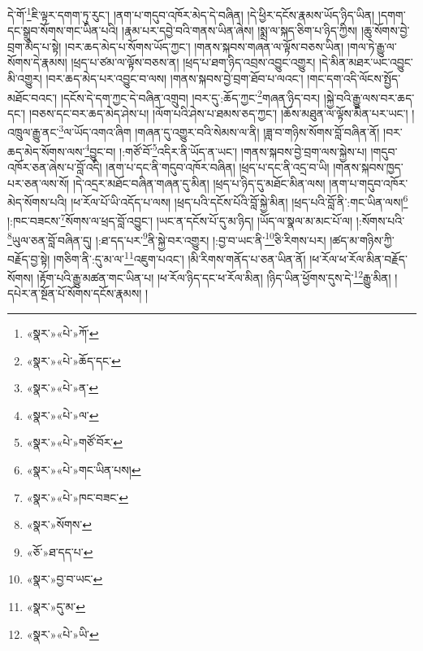 དེ་གོ་\footnote{«སྣར་»«པེ་»ཀོ་}ཇི་ལྟར་དགག་ཏུ་རུང་། །ནག་པ་གདུབ་འཁོར་མེད་དེ་བཞིན། །དེ་ཕྱིར་དངོས་རྣམས་ཡོད་ཉིད་ཡིན། །དགག་དང་སྒྲུབ་སོགས་གང་ཡིན་པའི། །རྣམ་པར་དབྱེ་བའི་གནས་ཡིན་ཞེས། །སྨྲ་ལ་སྐད་ཅིག་པ་ཉིད་ཀྱིས། །ཆུ་སོགས་བྱེ་བྲག་མེད་པ་སྟེ། །བར་ཆད་མེད་པ་སོགས་ཡོད་ཀྱང་། །གནས་སྐབས་གཞན་ལ་ལྟོས་བཅས་ཡིན། །གལ་ཏེ་རྒྱུ་ལ་སོགས་དེ་རྣམས། །ཕྲད་པ་ཙམ་ལ་ལྟོས་བཅས་ན། །ཕྲད་པ་ཐག་ཉིད་འབྲས་འབྱུང་འགྱུར། །དེ་མིན་མཐར་ཡང་འབྱུང་མི་འགྱུར། །བར་ཆད་མེད་པར་འབྱུང་བ་ལས། །གནས་སྐབས་བྱེ་བྲག་ཐོབ་པ་ལའང་། །གང་དག་འདི་ལོངས་སྤྱོད་མཐོང་བའང་། །དངོས་དེ་དག་ཀྱང་དེ་བཞིན་འགྲུབ། །བར་དུ་:ཆོད་ཀྱང་\footnote{«སྣར་»«པེ་»ཆོད་དང་}གཞན་ཉིད་བར། །སྐྱེ་བའི་རྒྱུ་ལས་བར་ཆད་དང་། །བཅས་དང་བར་ཆད་མེད་ཤེས་པ། །ལོག་པའི་ཤེས་པ་ཐམས་ཅད་ཀྱང་། །ཆོས་མཐུན་ལ་ལྟོས་མིན་པར་ཡང་། །འཁྲུལ་རྒྱུ་ནང་\footnote{«སྣར་»«པེ་»ན་}ལ་ཡོད་འགའ་ཞིག །གཞན་དུ་འགྱུར་བའི་སེམས་ལ་ནི། །ཟླ་བ་གཉིས་སོགས་བློ་བཞིན་ནོ། །བར་ཆད་མེད་སོགས་ལས་\footnote{«སྣར་»«པེ་»ལ་}བྱུང་བ། །:གཙོ་བོ་\footnote{«སྣར་»«པེ་»གཙོ་བོར་}འདིར་ནི་ཡོད་ན་ཡང་། །གནས་སྐབས་བྱེ་བྲག་ལས་སྐྱེས་པ། །གདུབ་འཁོར་ཅན་ཞེས་པ་བློ་འདི། །ནག་པ་དང་ནི་གདུབ་འཁོར་བཞིན། །ཕྲད་པ་དང་ནི་འདྲ་བ་ཡི། །གནས་སྐབས་ཁྱད་པར་ཅན་ལས་སོ། །དེ་འདྲར་མཐོང་བཞིན་གཞན་དུ་མིན། །ཕྲད་པ་ཉིད་དུ་མཐོང་མིན་ལས། །ནག་པ་གདུབ་འཁོར་མེད་སོགས་པའི། །ཕ་རོལ་པོ་ཡི་འདོད་པ་ལས། །ཕྲད་པའི་དངོས་པོའི་བློ་སྐྱེ་མིན། །ཕྲད་པའི་བློ་ནི་:གང་ཡིན་ལས།\footnote{«སྣར་»«པེ་»གང་ཡིན་པས།} །:ཁང་བཟངས་\footnote{«སྣར་»«པེ་»ཁང་བཟང་}སོགས་ལ་ཕྲད་བློ་འབྱུང་། །ཡང་ན་དངོས་པོ་དུ་མ་ཉིད། །ཡོད་ལ་སྣལ་མ་མང་པོ་ལ། །:སོགས་པའི་\footnote{«སྣར་»སོགས་}ཡུལ་ཅན་བློ་བཞིན་དུ། །:ཐ་དད་པར་\footnote{«ཅོ་»ཐ་དད་པ་}ནི་སྐྱེ་བར་འགྱུར། །:བྱ་བ་ཡང་ནི་\footnote{«སྣར་»བྱ་བ་ཡང་}ཅི་རིགས་པར། །ཚད་མ་གཉིས་ཀྱི་བརྗོད་བྱ་སྟེ། །གཅིག་ནི་:དུ་མ་ལ་\footnote{«སྣར་»དུ་མ་}འཇུག་པའང་། །མི་རིགས་གནོད་པ་ཅན་ཡིན་ནོ། །ཕ་རོལ་ཕ་རོལ་མིན་བརྗོད་སོགས། །རྟོག་པའི་རྒྱུ་མཚན་གང་ཡིན་པ། །ཕ་རོལ་ཉིད་དང་ཕ་རོལ་མིན། །ཉིད་ཡིན་ཕྱོགས་དུས་དེ་\footnote{«སྣར་»«པེ་»ཡི་}རྒྱུ་མིན། །དཔེར་ན་སྔོན་པོ་སོགས་དངོས་རྣམས། །
